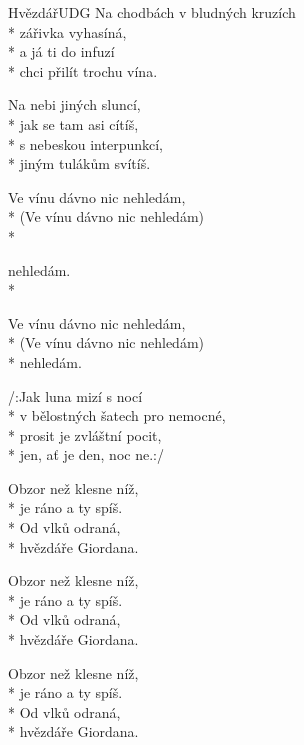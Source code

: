 \documentclass[10.5pt]{book}
\begin{document}
\begin{poem}{Hvězdář}{UDG}
Na chodbách v bludných kruzích \\*
zářivka vyhasíná,\\*
a já ti do infuzí \\*
chci přilít trochu vína.

Na nebi jiných sluncí, \\*
jak se tam asi cítíš,\\*
s nebeskou interpunkcí, \\*
jiným tulákům svítíš.

\begin{altverse}
Ve vínu dávno nic nehledám, \\*
(Ve vínu dávno nic nehledám) \\*
\end{altverse}
nehledám.\\*
\begin{altverse}
Ve vínu dávno nic nehledám, \\*
(Ve vínu dávno nic nehledám) \\*
nehledám.
\end{altverse}

/:Jak luna mizí s nocí\\*
v bělostných šatech pro nemocné,\\*
prosit je zvláštní pocit,\\*
jen, ať je den, noc ne.:/

Obzor než klesne níž, \\*
je ráno a ty spíš.\\*
Od vlků odraná, \\*
hvězdáře Giordana.

Obzor než klesne níž, \\*
je ráno a ty spíš.\\*
Od vlků odraná, \\*
hvězdáře Giordana.

Obzor než klesne níž, \\*
je ráno a ty spíš.\\*
Od vlků odraná, \\*
hvězdáře Giordana.
\end{poem}
\end{document}
